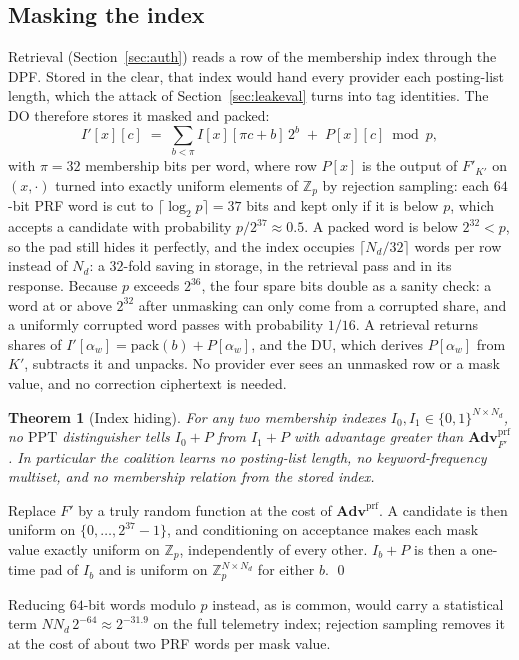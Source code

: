 \documentclass[a4paper,fleqn]{cas-sc}
\newif\ifauthorchecks
\newcommand{\authorcheck}[1]{\ifauthorchecks{\color{red}\textsf{[Authors: #1]}}\fi}
\newtheorem{theorem}{Theorem}
\newcommand{\PPT}{\mathrm{PPT}}
\newcommand{\advPRF}{\mathbf{Adv}^{\mathrm{prf}}}
\begin{document}
\subsection{Masking the index}
\label{sec:mask}
Retrieval (Section~\ref{sec:auth}) reads a row of the membership index through
the DPF. Stored in the clear, that index would hand every provider each
posting-list length, which the attack of Section~\ref{sec:leakeval} turns into
tag identities. The DO therefore stores it masked and packed:
\[
I'[x][c]\;=\;\sum_{b<\pi} I[x][\pi c+b]\,2^b \;+\; P[x][c] \bmod p ,
\]
with $\pi=32$ membership bits per word, where row $P[x]$ is the output of
$F'_{K'}$ on $(x,\cdot)$ turned into exactly uniform elements of
$\mathbb{Z}_p$ by rejection sampling: each $64$-bit PRF word is cut to
$\lceil\log_2 p\rceil=37$ bits and kept only if it is below $p$, which accepts
a candidate with probability $p/2^{37}\approx0.5$. A packed word is below
$2^{32}<p$, so the pad still hides it perfectly, and the index occupies
$\lceil N_d/32\rceil$ words per row instead of $N_d$: a $32$-fold saving in
storage, in the retrieval pass and in its response. Because $p$ exceeds $2^{36}$,
the four spare bits double as a sanity check: a word at or above $2^{32}$ after
unmasking can only come from a corrupted share, and a uniformly corrupted word
passes with probability $1/16$. A retrieval returns shares of
$I'[\alpha_w]=\mathrm{pack}(b)+P[\alpha_w]$, and the DU, which derives
$P[\alpha_w]$ from $K'$, subtracts it and unpacks. No provider ever sees an
unmasked row or a mask value, and no correction ciphertext is needed.

\begin{theorem}[Index hiding]
\label{thm:mask}
For any two membership indexes $I_0,I_1\in\{0,1\}^{N\times N_d}$, no $\PPT$
distinguisher tells $I_0+P$ from $I_1+P$ with advantage greater than
$\advPRF_{F'}$. In particular the coalition learns no posting-list length, no
keyword-frequency multiset, and no membership relation from the stored index.
\end{theorem}
\begin{pf}
Replace $F'$ by a truly random function at the cost of $\advPRF$. A candidate
is then uniform on $\{0,\dots,2^{37}-1\}$, and conditioning on acceptance makes
each mask value exactly uniform on $\mathbb{Z}_p$, independently of every
other. $I_b+P$ is then a one-time pad of $I_b$ and is uniform on
$\mathbb{Z}_p^{N\times N_d}$ for either $b$. \qed
\end{pf}

Reducing $64$-bit words modulo $p$ instead, as is common, would carry a
statistical term $N N_d\,2^{-64}\approx2^{-31.9}$ on the full
telemetry index; rejection sampling removes it at the cost of about two PRF
words per mask value. \authorcheck{The C++ prototype still reduces 64-bit
words; port the rejection sampler of the reference implementation
(crshe/prg.py) before re-running Section~\ref{sec:leakeval}.}
\end{document}
